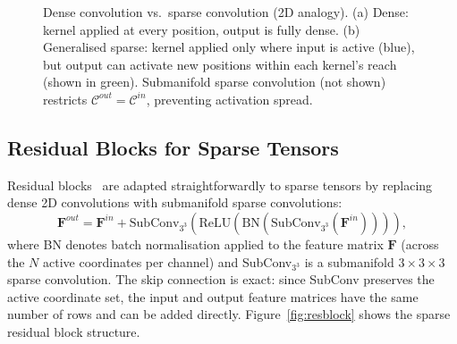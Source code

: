\begin{figure}[t]
{%
}
\caption{%
  Dense convolution vs.\ sparse convolution (2D analogy).
  (a) Dense: kernel applied at every position, output is fully dense.
  (b) Generalised sparse: kernel applied only where input is active (blue),
  but output can activate new positions within each kernel's reach (shown in green).
  Submanifold sparse convolution (not shown) restricts $\mathcal{C}^{out} = \mathcal{C}^{in}$,
  preventing activation spread.
}
\label{fig:sparse-conv}
\end{figure}

\subsection{Residual Blocks for Sparse Tensors}

Residual blocks~\cite{he2016deep} are adapted straightforwardly to sparse
tensors by replacing dense 2D convolutions with submanifold sparse convolutions:
\begin{equation}
  \mathbf{F}^{out} = \mathbf{F}^{in} +
    \text{SubConv}_{3^3}\!\left(
      \text{ReLU}\!\left(
        \text{BN}\!\left(
          \text{SubConv}_{3^3}(\mathbf{F}^{in})
        \right)
      \right)
    \right),
\end{equation}
where BN denotes batch normalisation applied to the feature matrix $\mathbf{F}$
(across the $N$ active coordinates per channel) and SubConv$_{3^3}$ is a
submanifold $3\times3\times3$ sparse convolution.
The skip connection is exact: since SubConv preserves the active coordinate set,
the input and output feature matrices have the same number of rows and can
be added directly.
Figure~\ref{fig:resblock} shows the sparse residual block structure.


